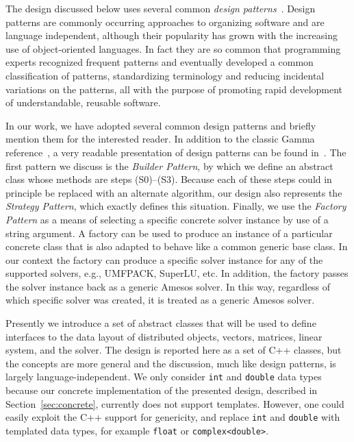 \documentclass[acmtoms,acmnow]{acmtrans2m}
\begin{document}
The design discussed below uses several common \textit{design
patterns}~\cite{Gamma}.  Design patterns are commonly occurring
approaches to organizing software and are language independent,
although their popularity has grown with the increasing use of
object-oriented languages. In fact they are so common that
programming experts recognized frequent patterns and eventually
developed a common classification of patterns, standardizing
terminology and reducing incidental variations on the patterns, all
with the purpose of promoting rapid development of understandable,
reusable software.

In our work, we have adopted several common design patterns and
briefly mention them for the interested reader. In addition to the
classic Gamma reference~\cite{Gamma}, a very readable presentation
of design patterns can be found in~\cite{HeadFirstDesignPatterns}.
The first pattern we discuss is the \textit{Builder Pattern}, by
which we define an abstract class whose methods are steps
(S0)--(S3). Because each of these steps could in principle be
replaced with an alternate algorithm, our design also represents the
\textit{Strategy Pattern}, which exactly defines this situation.
Finally, we use the \textit{Factory Pattern} as a means of selecting
a specific concrete solver instance by use of a string argument.  A
factory can be used to produce an instance of a particular concrete
class that is also adapted to behave like a common generic base
class. In our context the factory can produce a specific solver
instance for any of the supported solvers, e.g., UMFPACK, SuperLU,
etc.  In addition, the factory passes the solver instance back as a
generic Amesos solver. In this way, regardless of which specific
solver was created, it is treated as a generic Amesos solver.

Presently we introduce a set of abstract classes that will be used
to define interfaces to the data layout of distributed objects,
vectors, matrices, linear system, and the solver. The design is
reported here as a set of C++ classes, but the concepts are more
general and the discussion, much like design patterns, is largely
language-independent. We only consider {\tt int} and {\tt double}
data types because our concrete implementation of the presented
design, described in Section~\ref{sec:concrete}, currently does not
support templates. However, one could easily exploit the C++ support
for genericity, and replace {\tt int} and {\tt double} with
templated data types, for example \verb!float! or
\verb!complex<double>!.
\end{document}
